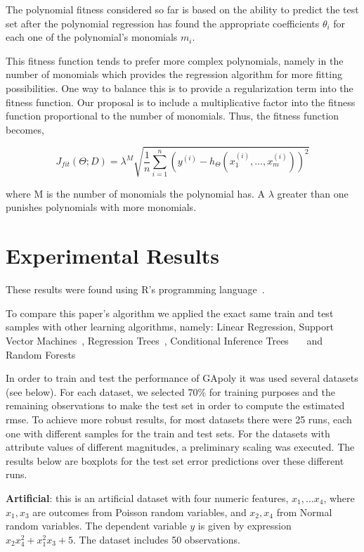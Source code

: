 \documentclass[a4paper, 12pt]{article}
\begin{document}
The polynomial fitness considered so far is based on the ability to predict the test set after the polynomial regression has found the appropriate coefficients $\theta_i$ for each one of the polynomial's monomials $m_i$.

This fitness function tends to prefer more complex polynomials, namely in the number of monomials which provides the regression algorithm for more fitting possibilities. One way to balance this is to provide a regularization term into the fitness function. Our proposal is to include a multiplicative factor into the fitness function proportional to the number of monomials. Thus, the fitness function becomes,

$$
J_{fit}\left( \Theta; D \right) = \lambda^{M} \sqrt{ \frac{1}{n} \sum_{i=1}^n \left( y^{(i)} - h_{\Theta}\left(x_1^{(i)}, \ldots, x_m^{(i)}\right) \right)^2 }
$$

where M is the number of monomials the polynomial has. A $\lambda$ greater than one punishes polynomials with more monomials.

\section{Experimental Results}

These results were found using R's programming language~\cite{R}.

To compare this paper's algorithm we applied the exact same train and test samples with other learning algorithms, namely: Linear Regression, Support Vector Machines~\cite{Meyer12}, Regression Trees~\cite{Therneau13}, Conditional Inference Trees~\cite{Hothorn06}~\cite{Strobl07}~\cite{Strobl08} and Random Forests~\cite{Liaw02}

In order to train and test the performance of GApoly it was used several datasets (see below). For each dataset, we selected 70\% for training purposes and the remaining observations to make the test set in order to compute the estimated rmse. To achieve more robust results, for most datasets there were 25 runs, each one with different samples for the train and test sets. For the datasets with attribute values of different magnitudes, a preliminary scaling was executed. The results below are boxplots for the test set error predictions over these different runs.

\textbf{Artificial}: this is an artificial dataset with four numeric features, $x_1, \ldots x_4$, where $x_1,x_3$ are outcomes from Poisson random variables, and $x_2,x_4$ from Normal random variables. The dependent variable $y$ is given by expression $x_2x_4^2 + x_1^2x_3 + 5$. The dataset includes 50 observations. 
\end{document}
